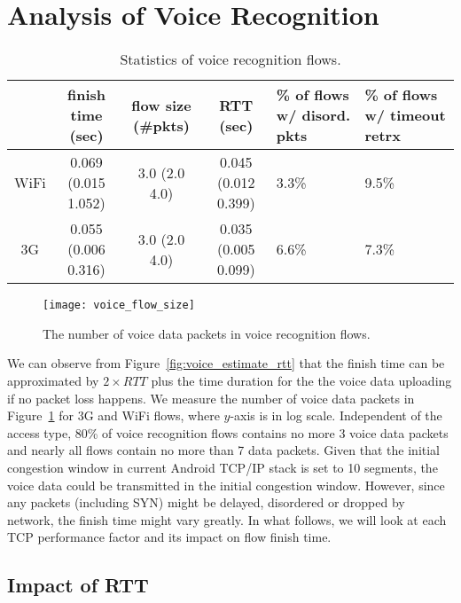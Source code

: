 
\section{Analysis of Voice Recognition}
\label{sec:voice}

\begin{table*}[th]
\caption{Statistics of voice recognition flows.}
\label{tab:voice_stats}
\centering
\renewcommand{\arraystretch}{1.0}
\begin{tabular}{c|c|c|c|C{2.1cm}|C{2.1cm}}
	\hline
	& finish time (sec) & flow size (\#pkts) & RTT (sec) & \% of flows w/ disord. pkts & \% of flows w/ timeout retrx \\
	\hline
	WiFi & 0.069 (0.015 1.052) & 3.0 (2.0 4.0) & 0.045 (0.012 0.399) & 3.3\% & 9.5\% \\
	\hline
	3G & 0.055 (0.006 0.316) & 3.0 (2.0 4.0) & 0.035 (0.005 0.099) & 6.6\% & 7.3\% \\
	\hline
\end{tabular}
\end{table*}

\begin{figure}[th]
	\centering
	\texttt{[image: voice\_flow\_size]}
	\caption{The number of voice data packets in voice recognition flows.}
	\label{fig:voice_flow_size}
\end{figure}

We can observe from Figure~\ref{fig:voice_estimate_rtt} that the finish time can be approximated by $2\times RTT$ plus the time duration for the the voice data uploading if no packet loss happens. We measure the number of voice data packets in Figure~\ref{fig:voice_flow_size} for 3G and WiFi flows, where $y$-axis is in log scale. Independent of the access type, 80\% of voice recognition flows contains no more 3 voice data packets and nearly all flows contain no more than 7 data packets. Given that the initial congestion window in current Android TCP/IP stack is set to 10 segments\cite{dukkipati2010argument}, the voice data could be transmitted in the initial congestion window. However, since any packets (including SYN) might be delayed, disordered or dropped by network, the finish time might vary greatly. In what follows, we will look at each TCP performance factor and its impact on flow finish time. 

\subsection{Impact of RTT}

